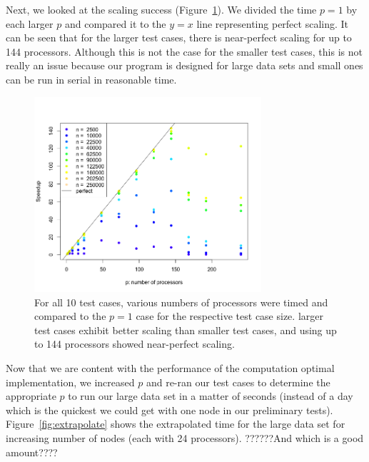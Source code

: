 Next, we looked at the scaling success (Figure~\ref{fig:scaling}). We divided the time $p=1$ by each larger $p$ and compared it to the $y=x$ line representing perfect scaling. It can be seen that for the larger test cases, there is near-perfect scaling for up to 144 processors. Although this is not the case for the smaller test cases, this is not really an issue because our program is designed for large data sets and small ones can be run in serial in reasonable time. 

\begin{figure}[!h]
   \centering
   \includegraphics[width=0.75\textwidth]{./fig/speedup.png} %
   \caption{For all 10 test cases, various numbers of processors were timed and compared to the $p=1$ case for the respective test case size. larger test cases exhibit better scaling than smaller test cases, and using up to 144 processors showed near-perfect scaling.}
   \label{fig:scaling}
\end{figure}

Now that we are content with the performance of the computation optimal implementation, we increased $p$ and re-ran our test cases to determine the appropriate $p$ to run our large data set in a matter of seconds (instead of a day which is the quickest we could get with one node in our preliminary tests). Figure~\ref{fig:extrapolate} shows the extrapolated time for the large data set for  increasing number of nodes (each with 24 processors). ??????And which is a good amount???? 

